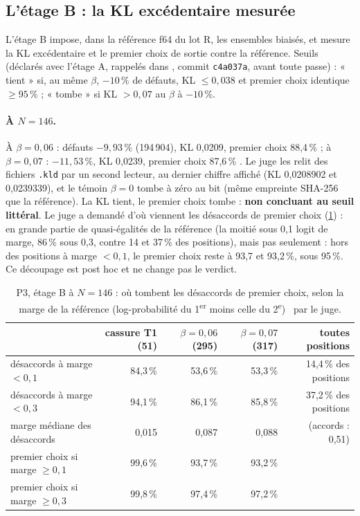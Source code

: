 \subsection{L'étage B : la KL excédentaire mesurée}\label{t3mim:sec:p3-etageB}

L'étage B impose, dans la référence f64 du lot R, les ensembles biaisés, et mesure la KL excédentaire et le premier choix de sortie contre la référence. Seuils (déclarés avec l'étage A, rappelés dans , commit \texttt{c4a037a}, avant toute passe) : « tient » si, au même $\beta$, $-10\,\%$ de défauts, KL $\le 0{,}038$ et premier choix identique $\ge 95\,\%$ ; « tombe » si KL $> 0{,}07$ au $\beta$ à $-10\,\%$.

\paragraph{À $N = 146$.} À $\beta = 0{,}06$ : défauts $-9{,}93\,\%$ (194\,904), KL 0,0209, premier choix 88,4\,\% ; à $\beta = 0{,}07$ : $-11{,}53\,\%$, KL 0,0239, premier choix 87,6\,\% \mes. Le juge les relit des fichiers \texttt{.kld} par un second lecteur, au dernier chiffre affiché (KL 0,0208902 et 0,0239339), et le témoin $\beta = 0$ tombe à zéro au bit (même empreinte SHA-256 que la référence). La KL tient, le premier choix tombe : \textbf{non concluant au seuil littéral}. Le juge a demandé d'où viennent les désaccords de premier choix (\cref{t3mim:tab:p3-quasi}) : en grande partie de quasi-égalités de la référence (la moitié sous 0,1 logit de marge, 86\,\% sous 0,3, contre 14 et 37\,\% des positions), mais pas seulement : hors des positions à marge $< 0{,}1$, le premier choix reste à 93,7 et 93,2\,\%, sous 95\,\%. Ce découpage est post hoc et ne change pas le verdict.

\begin{table}[tbp]
\centering\small
\caption[P3, étage B à $N = 146$ : les désaccords de premier choix]{P3, étage B à $N = 146$ : où tombent les désaccords de premier choix, selon la marge de la référence (log-probabilité du 1\textsuperscript{er} moins celle du 2\textsuperscript{e}) \mes~par le juge.}
\label{t3mim:tab:p3-quasi}
\begin{tabular}{@{}lrrrr@{}}
\toprule
& cassure T1 (51) & $\beta = 0{,}06$ (295) & $\beta = 0{,}07$ (317) & toutes positions \\
\midrule
désaccords à marge $< 0{,}1$ & 84,3\,\% & 53,6\,\% & 53,3\,\% & 14,4\,\% des positions \\
désaccords à marge $< 0{,}3$ & 94,1\,\% & 86,1\,\% & 85,8\,\% & 37,2\,\% des positions \\
marge médiane des désaccords & 0,015 & 0,087 & 0,088 & (accords : 0,51) \\
premier choix si marge $\ge 0{,}1$ & 99,6\,\% & 93,7\,\% & 93,2\,\% & \\
premier choix si marge $\ge 0{,}3$ & 99,8\,\% & 97,4\,\% & 97,2\,\% & \\
\bottomrule
\end{tabular}
\end{table}

